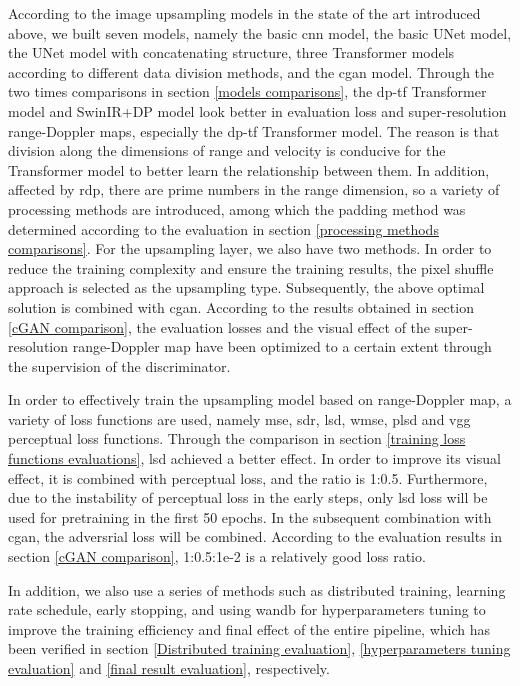 According to the image upsampling models in the state of the art introduced above, we built seven models, namely the basic \gls{cnn} model, the basic UNet model, the UNet model with concatenating structure, three Transformer models according to different data division methods, and the \gls{cgan} model. Through the two times comparisons in section \ref{models comparisons}, the \gls{dp}-\gls{tf} Transformer model and SwinIR+DP model look better in evaluation loss and super-resolution range-Doppler maps, especially the \gls{dp}-\gls{tf} Transformer model. The reason is that division along the dimensions of range and velocity is conducive for the Transformer model to better learn the relationship between them. In addition, affected by \gls{rdp}, there are prime numbers in the range dimension, so a variety of processing methods are introduced, among which the padding method was determined according to the evaluation in section \ref{processing methods comparisons}. For the upsampling layer, we also have two methods. In order to reduce the training complexity and ensure the training results, the pixel shuffle approach is selected as the upsampling type. Subsequently, the above optimal solution is combined with \gls{cgan}. According to the results obtained in section \ref{cGAN comparison}, the evaluation losses and the visual effect of the super-resolution range-Doppler map have been optimized to a certain extent through the supervision of the discriminator.

In order to effectively train the upsampling model based on range-Doppler map, a variety of loss functions are used, namely \gls{mse}, \gls{sdr}, \gls{lsd}, \gls{wmse}, \gls{plsd} and \gls{vgg} perceptual loss functions. Through the comparison in section \ref{training loss functions evaluations}, \gls{lsd} achieved a better effect. In order to improve its visual effect, it is combined with perceptual loss, and the ratio is 1:0.5. Furthermore, due to the instability of perceptual loss in the early steps, only \gls{lsd} loss will be used for pretraining in the first 50 epochs. In the subsequent combination with \gls{cgan}, the adversrial loss will be combined. According to the evaluation results in section \ref{cGAN comparison}, 1:0.5:1e-2 is a relatively good loss ratio.

In addition, we also use a series of methods such as distributed training, learning rate schedule, early stopping, and using \gls{wandb} for hyperparameters tuning to improve the training efficiency and final effect of the entire pipeline, which has been verified in section \ref{Distributed training evaluation}, \ref{hyperparameters tuning evaluation} and \ref{final result evaluation}, respectively.

